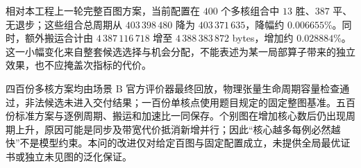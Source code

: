 相对本工程上一轮完整百图方案，当前配置在 $400$ 个多核组合中 $13$ 胜、$387$ 平、无退步；这些组合总周期从 $403\,398\,480$ 降为 $403\,371\,635$，降幅约 $0.006655\%$。同时，额外搬运合计由 $4\,387\,116\,718$ 增至 $4\,388\,383\,872$ bytes，增加约 $0.028884\%$。这一小幅变化来自整套候选选择与机会分配，不能表述为某一局部算子带来的独立效果，也不应掩盖次指标的代价。

四百份多核方案均由场景 B 官方评价器最终回放，物理张量生命周期容量检查通过，非法候选未进入交付结果；一百份单核点使用题目规定的固定整图基准。五百份标准方案与逐例周期、搬运和加速比一同保存。个别图在增加核心数后仍出现周期上升，原因可能是同步及带宽代价抵消新增并行；因此“核心越多每例必然越快”不是模型约束。本问的改进仅对给定百图与固定配置成立，未提供全局最优证书或独立未见图的泛化保证。

